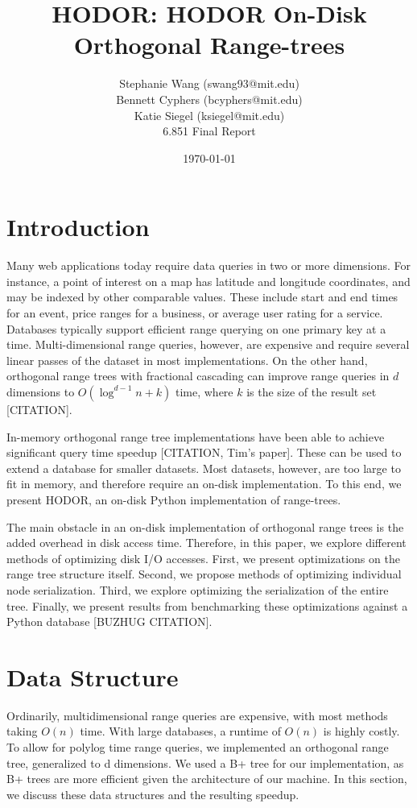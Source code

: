 \documentclass[11pt, oneside]{article}
\title{HODOR: HODOR On-Disk Orthogonal Range-trees}
\author{Stephanie Wang (swang93@mit.edu)\\
Bennett Cyphers (bcyphers@mit.edu)\\
Katie Siegel (ksiegel@mit.edu)\\[2ex]
6.851 Final Report}
\date{\today}
\begin{document}
\maketitle
\clearpage

\section{Introduction}

Many web applications today require data queries in two or more dimensions. For instance, a point of interest on a map has latitude and longitude coordinates, and may be indexed by other comparable values. These include start and end times for an event, price ranges for a business, or average user rating for a service. Databases typically support efficient range querying on one primary key at a time. Multi-dimensional range queries, however, are expensive and require several linear passes of the dataset in most implementations. On the other hand, orthogonal range trees with fractional cascading can improve range queries in $d$ dimensions to $O(\log^{d-1} n + k)$ time, where $k$ is the size of the result set [CITATION]. 

In-memory orthogonal range tree implementations have been able to achieve significant query time speedup [CITATION, Tim's paper]. These can be used to extend a database for smaller datasets. Most datasets, however, are too large to fit in memory, and therefore require an on-disk implementation. To this end, we present HODOR, an on-disk Python implementation of range-trees. 

The main obstacle in an on-disk implementation of orthogonal range trees is the added overhead in disk access time. Therefore, in this paper, we explore different methods of optimizing disk I/O accesses. First, we present optimizations on the range tree structure itself. Second, we propose methods of optimizing individual node serialization. Third, we explore optimizing the serialization of the entire tree. Finally, we present results from benchmarking these optimizations against a Python database [BUZHUG CITATION]. 


\section{Data Structure}


Ordinarily, multidimensional range queries are expensive, with most methods taking $O(n)$ time. With large databases, a runtime of $O(n)$ is highly costly. To allow for polylog time range queries, we implemented an orthogonal range tree, generalized to d dimensions. We used a B+ tree for our implementation, as B+ trees are more efficient given the architecture of our machine. In this section, we discuss these data structures and the resulting speedup.
\end{document}
